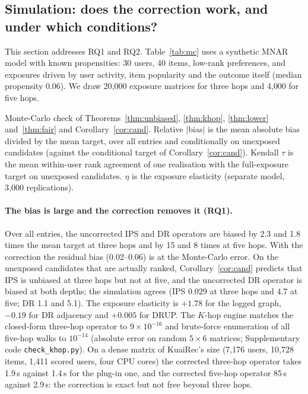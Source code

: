 \subsection{Simulation: does the correction work, and under which conditions?}\label{sec:mc}

This section addresses RQ1 and RQ2. Table~\ref{tab:mc} uses a synthetic MNAR model
with known propensities: 30 users, 40 items, low-rank preferences, and exposures
driven by user activity, item popularity and the outcome itself (median
propensity 0.06). We draw 20{,}000 exposure matrices for three hops and 4{,}000 for
five hops.

\begin{table}[t]\centering\small
\caption{Monte-Carlo check of Theorems~\ref{thm:unbiased}, \ref{thm:khop}, \ref{thm:lower}
and~\ref{thm:fair} and Corollary~\ref{cor:cand}. Relative $|$bias$|$ is the mean absolute
bias divided by the mean target, over all entries and conditionally on unexposed
candidates (against the conditional target of Corollary~\ref{cor:cand}). Kendall
$\tau$ is the mean within-user rank agreement of one realisation with the
full-exposure target on unexposed candidates. $\eta$ is the exposure elasticity
(separate model, 3{,}000 replications).}\label{tab:mc}
\begin{adjustbox}{max width=\textwidth}

\end{adjustbox}
\end{table}

\paragraph{The bias is large and the correction removes it (RQ1).} Over all entries, the
uncorrected IPS and DR operators are biased by 2.3 and 1.8 times the mean target
at three hops and by 15 and 8 times at five hops. With the correction the residual
bias (0.02--0.06) is at the Monte-Carlo error. On the unexposed candidates that are
actually ranked, Corollary~\ref{cor:cand} predicts that IPS is unbiased at three
hops but not at five, and the uncorrected DR operator is biased at both depths;
the simulation agrees (IPS 0.029 at three hops and 4.7 at five; DR 1.1 and 5.1).
The exposure elasticity is $+1.78$ for the logged graph, $-0.19$ for DR adjacency
and $+0.005$ for DRUP. The $K$-hop engine matches the closed-form three-hop
operator to $9\times10^{-16}$ and brute-force enumeration of all five-hop walks to
$10^{-14}$ (absolute error on random $5\times6$ matrices; Supplementary code \texttt{check\_khop.py}). On a dense matrix of KuaiRec's size (7{,}176 users, 10{,}728 items, 1{,}411
scored users, four CPU cores) the corrected three-hop operator takes 1.9\,s against
1.4\,s for the plug-in one, and the corrected five-hop operator 85\,s against
2.9\,s: the correction is exact but not free beyond three hops.

